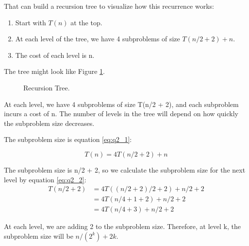 \documentclass{article}
\begin{document}
    That can build a recursion tree to visualize how this recurrence works:

    \begin{enumerate}
      \item Start with $ T \left(n\right)  $ at the top.
      \item At each level of the tree, we have 4 subproblems of size $ T \left( n/2 + 2 \right) + n  $.
      \item The cost of each level is n.
    \end{enumerate}

    The tree might look like Figure \ref{fig:tree2}.

  \begin{figure}[h!]
    \centering
    \caption{Recursion Tree.}
    \label{fig:tree2}
  \end{figure}

  At each level, we have 4 subproblems of size T(n/2 + 2), and each subproblem incurs a cost of n. The number of levels in the tree will depend on how quickly the subproblem size decreases.

  The subproblem size is equation \eqref{eq:q2_1}:

  \begin{equation}
    T(n) = 4T(n/2 + 2) + n
    \label{eq:q2_1}
  \end{equation}

  The subproblem size is n/2 + 2, so we calculate the subproblem size for the next level by equation \eqref{eq:q2_2}:
  \begin{equation}
    \begin{aligned}
      T(n/2 + 2) &= 4T((n/2 + 2)/2 + 2) + n/2 + 2 \\
      &= 4T(n/4 + 1 + 2) + n/2 + 2 \\
      &= 4T(n/4 + 3) + n/2 + 2      
    \end{aligned}
    \label{eq:q2_2}
  \end{equation}

  At each level, we are adding 2 to the subproblem size. Therefore, at level k, the subproblem size will be $ n/(2^k) + 2k $.
\end{document}
